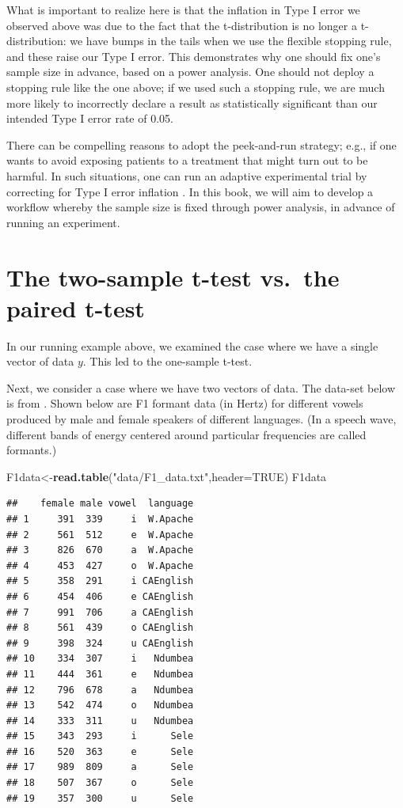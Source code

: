 \documentclass[12pt,]{krantz}
\newenvironment{Shaded}{\begin{snugshade}}{\end{snugshade}}
\newcommand{\DataTypeTok}[1]{\textcolor[rgb]{0.13,0.29,0.53}{#1}}
\newcommand{\KeywordTok}[1]{\textcolor[rgb]{0.13,0.29,0.53}{\textbf{#1}}}
\newcommand{\NormalTok}[1]{#1}
\newcommand{\OtherTok}[1]{\textcolor[rgb]{0.56,0.35,0.01}{#1}}
\newcommand{\StringTok}[1]{\textcolor[rgb]{0.31,0.60,0.02}{#1}}
\begin{document}
What is important to realize here is that the inflation in Type I error we observed above was due to the fact that the t-distribution is no longer a t-distribution: we have bumps in the tails when we use the flexible stopping rule, and these raise our Type I error. This demonstrates why one should fix one's sample size in advance, based on a power analysis. One should not deploy a stopping rule like the one above; if we used such a stopping rule, we are much more likely to incorrectly declare a result as statistically significant than our intended Type I error rate of 0.05.

There can be compelling reasons to adopt the peek-and-run strategy; e.g., if one wants to avoid exposing patients to a treatment that might turn out to be harmful. In such situations, one can run an adaptive experimental trial by correcting for Type I error inflation \citep{pocock2013clinical}. In this book, we will aim to develop a workflow whereby the sample size is fixed through power analysis, in advance of running an experiment.

\hypertarget{the-two-sample-t-test-vs.the-paired-t-test}{%
\section{The two-sample t-test vs.~the paired t-test}\label{the-two-sample-t-test-vs.the-paired-t-test}}

In our running example above, we examined the case where we have a single vector of data \(y\). This led to the one-sample t-test.

Next, we consider a case where we have two vectors of data. The data-set below is from \citet{johnson2011quantitative}. Shown below are F1 formant data (in Hertz) for different vowels produced by male and female speakers of different languages. (In a speech wave, different bands of energy centered around particular frequencies are called formants.)

\begin{Shaded}
\begin{Highlighting}[]
\NormalTok{F1data<-}\KeywordTok{read.table}\NormalTok{(}\StringTok{"data/F1_data.txt"}\NormalTok{,}\DataTypeTok{header=}\OtherTok{TRUE}\NormalTok{)}
\NormalTok{F1data}
\end{Highlighting}
\end{Shaded}

\begin{verbatim}
##    female male vowel  language
## 1     391  339     i  W.Apache
## 2     561  512     e  W.Apache
## 3     826  670     a  W.Apache
## 4     453  427     o  W.Apache
## 5     358  291     i CAEnglish
## 6     454  406     e CAEnglish
## 7     991  706     a CAEnglish
## 8     561  439     o CAEnglish
## 9     398  324     u CAEnglish
## 10    334  307     i   Ndumbea
## 11    444  361     e   Ndumbea
## 12    796  678     a   Ndumbea
## 13    542  474     o   Ndumbea
## 14    333  311     u   Ndumbea
## 15    343  293     i      Sele
## 16    520  363     e      Sele
## 17    989  809     a      Sele
## 18    507  367     o      Sele
## 19    357  300     u      Sele
\end{verbatim}
\end{document}
